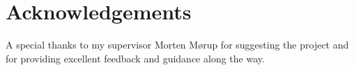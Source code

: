 \chapter{Acknowledgements}

A special thanks to my supervisor Morten Mørup for suggesting the project and for providing excellent feedback and guidance along the way.